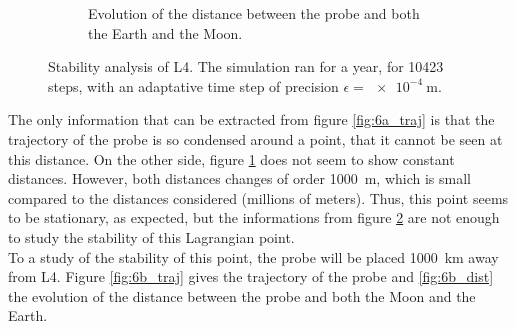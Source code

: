 \documentclass[a4paper,12pt,twoside]{article}
\begin{document}
\begin{figure}[h]
\begin{subfigure}[t]{0.55\textwidth}
    \caption{Evolution of the distance between the probe and both the Earth and the Moon.}
    \label{fig:6a_dist}
  \end{subfigure}
  \caption{Stability analysis of L4. The simulation ran for a year, for \num{10423} steps, with an adaptative time step of precision $\epsilon = \SI{e-4}{\m}$.}
  \label{fig:6a_stab}
\end{figure}

The only information that can be extracted from figure \ref{fig:6a_traj} is that the trajectory of the probe is so condensed around a point, that it cannot be seen at this distance.
On the other side, figure \ref{fig:6a_dist} does not seem to show constant distances.
However, both distances changes of order \SI{1000}{\m}, which is small compared to the distances considered (millions of meters).
Thus, this point seems to be stationary, as expected, but the informations from figure \ref{fig:6a_stab} are not enough to study the stability of this Lagrangian point.\\

To a study of the stability of this point, the probe will be placed \SI{1000}{\km} away from L4.
Figure \ref{fig:6b_traj} gives the trajectory of the probe and \ref{fig:6b_dist} the evolution of the distance between the probe and both the Moon and the Earth.
\end{document}
